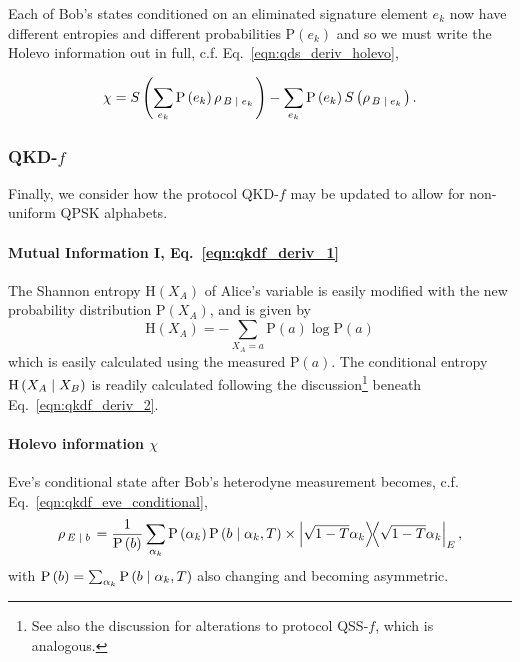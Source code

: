 Each of Bob's states conditioned on an eliminated signature element $e_k$ now have different entropies and different probabilities $\text{P}\left(e_k\right)$ and so we must write the Holevo information out in full, c.f. Eq.~\ref{eqn:qds_deriv_holevo},

\begin{equation}
\chi = S\left(\sum_{e_k} \text{P}\left(e_k\right) \rho_{\left.B\; \middle| \; e_k\right.}\right) - \sum_{e_k} \text{P}\left(e_k\right) S\left(\rho_{\left.B\; \middle| \; e_k\right.}\right).
\end{equation}

\subsubsection{QKD-$f$}



Finally, we consider how the protocol QKD-$f$ may be updated to allow for non-uniform QPSK alphabets.

\paragraph{Mutual Information I, Eq.~\ref{eqn:qkdf_deriv_1}}

The Shannon entropy $\text{H}\left(X_A\right)$ of Alice's variable is easily modified with the new probability distribution $\text{P}\left(X_A\right)$, and is given by
\begin{equation}
\text{H}\left(X_A\right) = - \sum_{X_A=a} \text{P}\left(a\right) \log \text{P}\left(a\right)
\end{equation}
which is easily calculated using the measured $\text{P}\left(a\right)$. The conditional entropy $\text{H}\left(X_A \; \middle| \; X_B\right)$ is readily calculated following the discussion\footnote{See also the discussion for alterations to protocol QSS-$f$, which is analogous.} beneath Eq.~\ref{eqn:qkdf_deriv_2}.

\paragraph{Holevo information $\chi$}
Eve's conditional state after Bob's heterodyne measurement becomes, c.f. Eq.~\ref{eqn:qkdf_eve_conditional},
\begin{equation}\label{eqn:qkdf_eve_conditional_modified}
\rho_{\left. E \given b\right.} = \frac{1}{\text{P}\left(b\right)} \sum_{\alpha_k} \text{P}\left(\alpha_k\right) \text{P}\left(b \given \alpha_k, T\right) \times \dyad{\sqrt{1-T}\alpha_k}_E,
\end{equation}
with $\text{P}\left(b\right) = \sum_{\alpha_k} \text{P}\left(b \; \middle| \; \alpha_k, T\right)$ also changing and becoming asymmetric. 

